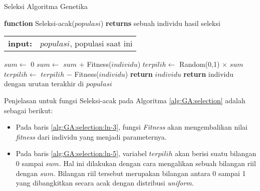 \begin{algorithm}[H]
	\caption{Seleksi Algoritma Genetika}
	\label{alg:GA:selection}
	\begin{flushleft}
		\textbf{function} Seleksi-acak($populasi$) \textbf{returns} sebuah individu hasil seleksi
		\begin{flushleft}
			\begin{tabular}{ l l }
				\textbf{input:}& $populasi$, populasi saat ini
				\hspace{5pt} 
			\end{tabular} 
		\end{flushleft}
	\end{flushleft}
	
	\begin{algorithmic}[1]
		\STATE $sum \leftarrow$ 0 \label{alg:GA:selection:ln-1}
		 \label{alg:GA:selection:ln-2}
			\STATE $sum \leftarrow$ $sum$ $+$ Fitness($individu$) \label{alg:GA:selection:ln-3}
		\ENDFOR \label{alg:GA:selection:ln-4}
		\STATE $terpilih \leftarrow$ Random(0,1) $\times$ $sum$ \label{alg:GA:selection:ln-5}
		 \label{alg:GA:selection:ln-6}
			\STATE $terpilih \leftarrow$ $terpilih$ $-$ Fitness($individu$) \label{alg:GA:selection:ln-7}
			 \label{alg:GA:selection:ln-8}
				\STATE \textbf{return}  $individu$ \label{alg:GA:selection:ln-9}
			\ENDIF \label{alg:GA:selection:ln-10}
		\ENDFOR \label{alg:GA:selection:ln-11}
		\STATE \textbf{return}  individu dengan urutan terakhir di $populasi$ \label{alg:GA:selection:ln-12}
	\end{algorithmic}
\end{algorithm}

Penjelasan untuk fungsi Seleksi-acak pada Algoritma \ref{alg:GA:selection} adalah sebagai berikut:
\begin{itemize}
	\item Pada baris \ref{alg:GA:selection:ln-3}, fungsi \textit{Fitness} akan mengembalikan nilai \textit{fitness} dari individu yang menjadi parameternya.
	\item Pada baris \ref{alg:GA:selection:ln-5}, variabel $terpilih$ akan berisi suatu bilangan 0 sampai $sum$. Hal ini dilakukan dengan cara mengalikan sebuah bilangan riil dengan $sum$. Bilangan riil tersebut merupakan bilangan antara 0 sampai 1 yang dibangkitkan secara acak dengan distribusi \textit{uniform}.
\end{itemize}

